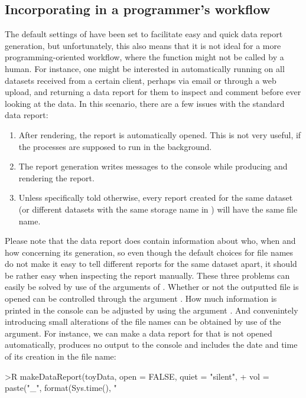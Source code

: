 \documentclass[article,shortnames]{jss}
\begin{document}
\subsection[Incorporating dataMaid in a programmer's workflow]{Incorporating  in a programmer's workflow}
The default settings of  have been set to facilitate easy and quick data report generation, but unfortunately, this also means that it is not ideal for a more programming-oriented workflow, where the function might not be called by a human. For instance, one might be interested in automatically running  on all datasets received from a certain client, perhaps via email or through a web upload, and returning a data report for them to inspect and comment before ever looking at the data. In this scenario, there are a few issues with the standard data report:
\begin{enumerate}
\item After rendering, the report is automatically opened. This is not very useful, if the processes are supposed to run in the background.
\item The report generation writes messages to the console while producing and rendering the report.
\item Unless specifically told otherwise, every report created for the same dataset (or different datasets with the same storage name in ) will have the same file name.
\end{enumerate}
Please note that the data report does contain information about who, when and how concerning its generation, so even though the default choices for file names do not make it easy to tell different reports for the same dataset apart, it should be rather easy when inspecting the report manually. These three problems can easily be solved by use of the arguments of . Whether or not the outputted file is opened can be controlled through the argument . How much information is printed in the console can be adjusted by using the argument . And convenintely introducing small alterations of the file names can be obtained by use of the  argument. For instance, we can make a data report for  that is not opened automatically, produces no output to the console and includes the date and time of its creation in the file name:

\begin{Schunk}
\begin{Sinput}
>R makeDataReport(toyData, open = FALSE, quiet = "silent",
+   vol = paste("_", format(Sys.time(), "%
\end{Sinput}
\end{Schunk}
\end{document}
